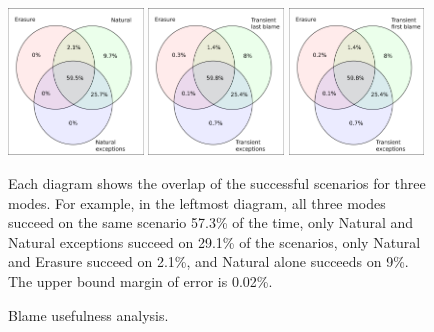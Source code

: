 \begin{figure}
  \centering
  \includegraphics[width=0.32\textwidth]{./plots/TR-TR-stack-first-venn}
  \hfill
  \includegraphics[width=0.32\textwidth]{./plots/transient-newest-transient-stack-first-venn}
  \hfill
  \includegraphics[width=0.32\textwidth]{./plots/transient-oldest-transient-stack-first-venn}

  \vspace{1em}
  \begin{minipage}{0.95\textwidth}
  Each diagram shows the overlap of the successful scenarios for three modes.  
     For example, in the leftmost diagram, all three modes succeed on the
    same scenario 57.3\% of the time, only Natural and Natural exceptions
    succeed on 29.1\% of the scenarios, only Natural and Erasure succeed
    on 2.1\%, and Natural alone succeeds on 9\%.  The upper bound margin
    of error is 0.02\%.
  \end{minipage}

  \caption{Blame usefulness analysis.}
  \label{fig:success-venns}
\end{figure}


